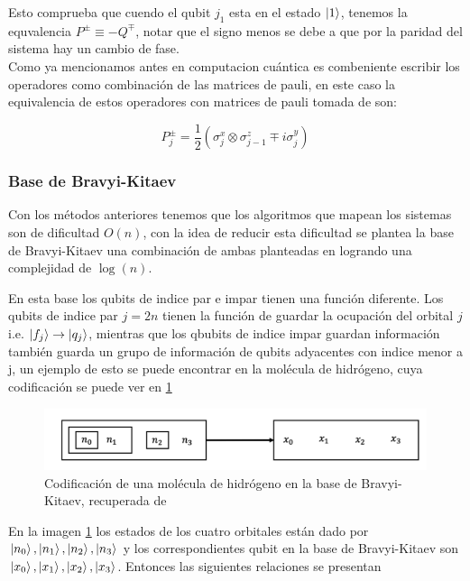 \documentclass[12pt, oneside]{article}
\begin{document}
Esto comprueba que cuendo el qubit $j_1$ esta en el estado $\ket{1}$, tenemos la equvalencia $P^\pm\equiv -Q^\mp$, notar que el signo menos se debe a que por la paridad del sistema hay un cambio de fase.\\

Como ya mencionamos antes en computacion cuántica es combeniente escribir los operadores como combinación de las matrices de pauli, en este caso la equivalencia de estos operadores con matrices de pauli tomada de \cite{bravyi2002fermionic} son:

\begin{equation}
    P^\pm_{j}=\frac{1}{2}(\sigma^x_j\otimes\sigma^z_{j-1} \mp i\sigma^y_{j})
\end{equation}

\subsubsection{Base de Bravyi-Kitaev}

Con los métodos anteriores tenemos que los algoritmos que mapean los sistemas son de dificultad $O(n)$, con la idea de reducir esta dificultad se plantea la base de Bravyi-Kitaev una combinación de ambas planteadas en \cite{bravyi2002fermionic} logrando una complejidad de $\log(n)$.

En esta base los qubits de indice par e impar tienen una función diferente. Los qubits de indice par $j=2n$ tienen la función de guardar la ocupación del orbital $j$ i.e. $\ket{f_j}\rightarrow\ket{q_j}$, mientras que los qbubits de indice impar guardan información también guarda un grupo de información de qubits adyacentes con indice menor a j, un ejemplo de esto se puede encontrar en la molécula de hidrógeno, cuya codificación se puede ver en \ref{fig:cod-h2}

\begin{figure}[h]
    \centering
    \includegraphics[width=0.5\linewidth]{imagenes//img-transformacion-de-bravyi/codificacion-molecula-de-hidrogeno.png}
    \caption{Codificación de una molécula de hidrógeno en la base de Bravyi-Kitaev, recuperada de \cite{zhang2022quantum}}
    \label{fig:cod-h2}
\end{figure}

En la imagen \ref{fig:cod-h2} los estados de los cuatro orbitales están dado por $\ket{n_0},\ket{n_1},\ket{n_2},\ket{n_3}$ y los correspondientes qubit en la base de Bravyi-Kitaev son $\ket{x_0},\ket{x_1},\ket{x_2},\ket{x_3}$. Entonces las siguientes relaciones se presentan
\end{document}
